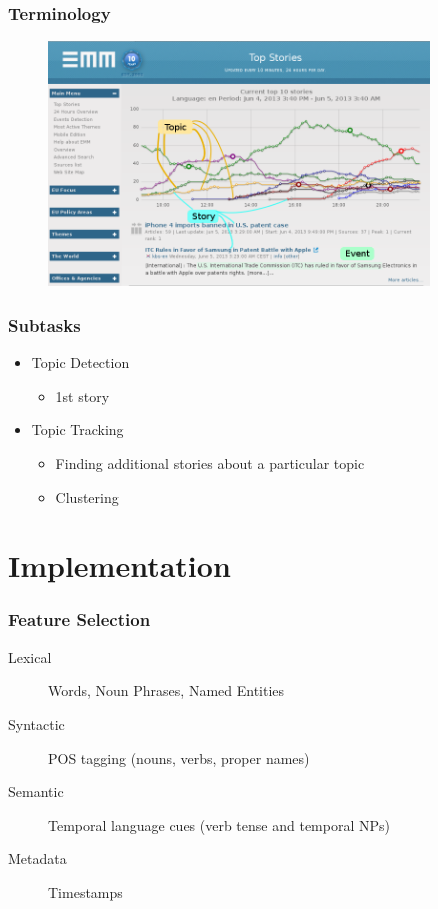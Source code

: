 \documentclass{beamer}
\begin{document}
\begin{frame}
  \frametitle{Terminology}
  \begin{figure}[h]
    \centering
    \includegraphics[width=0.9\textwidth]{images/emm_1}
  \end{figure}
\end{frame}

\begin{frame}
	\frametitle{Subtasks}
	\begin{itemize}
		\item Topic Detection
			\begin{itemize}
				\item 1st story
			\end{itemize}
		\item Topic Tracking
			\begin{itemize}
				\item Finding additional stories about a particular topic
				\item Clustering
			\end{itemize}
	\end{itemize}
\end{frame}

\section{Implementation}
\begin{frame}
	\frametitle{Feature Selection}
	\begin{description}
		\item[Lexical] Words, Noun Phrases, Named Entities
		\item[Syntactic] POS tagging (nouns, verbs, proper names)
		\item[Semantic] Temporal language cues (verb tense and temporal NPs)\cite{Makkonen:2003:UTITDT}
		\item[Metadata] Timestamps
	\end{description}
\end{frame}
\end{document}
